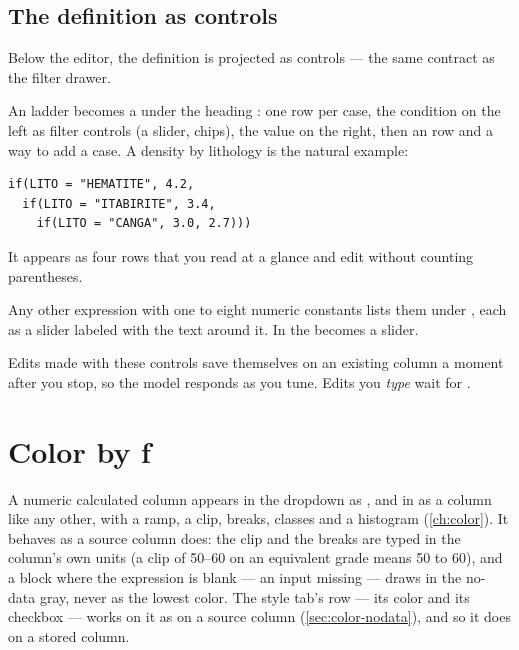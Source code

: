\subsection{The definition as controls}
Below the editor, the definition is projected as controls — the same contract as the filter drawer.

An  ladder becomes a  under the heading : one row per case, the condition on the left as filter controls (a slider, chips), the value on the right, then an  row and a way to add a case. A density by lithology is the natural example:

\begin{lstlisting}[language=expr]
if(LITO = "HEMATITE", 4.2,
  if(LITO = "ITABIRITE", 3.4,
    if(LITO = "CANGA", 3.0, 2.7)))
\end{lstlisting}

It appears as four rows that you read at a glance and edit without counting parentheses.

Any other expression with one to eight numeric constants lists them under , each as a slider labeled with the text around it. In  the  becomes a slider.

Edits made with these controls save themselves on an existing column a moment after you stop, so the model responds as you tune. Edits you \emph{type} wait for .


\section{Color by ƒ}\label{sec:filter-colorby}
A numeric calculated column appears in the  dropdown as , and in  as a column like any other, with a ramp, a clip, breaks, classes and a histogram (\cref{ch:color}). It behaves as a source column does: the clip and the breaks are typed in the column's own units (a clip of 50–60 on an equivalent grade means 50 to 60), and a block where the expression is blank — an input missing — draws in the no-data gray, never as the lowest color. The style tab's  row — its color and its  checkbox — works on it as on a source column (\cref{sec:color-nodata}), and so it does on a stored column.

